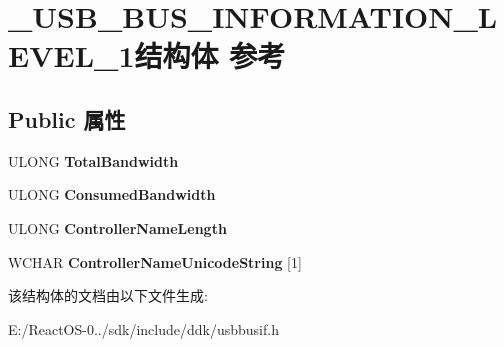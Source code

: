 \hypertarget{struct___u_s_b___b_u_s___i_n_f_o_r_m_a_t_i_o_n___l_e_v_e_l__1}{}\section{\+\_\+\+U\+S\+B\+\_\+\+B\+U\+S\+\_\+\+I\+N\+F\+O\+R\+M\+A\+T\+I\+O\+N\+\_\+\+L\+E\+V\+E\+L\+\_\+1结构体 参考}
\label{struct___u_s_b___b_u_s___i_n_f_o_r_m_a_t_i_o_n___l_e_v_e_l__1}
\subsection*{Public 属性}
\begin{DoxyCompactItemize}
\item 
\mbox{\label{struct___u_s_b___b_u_s___i_n_f_o_r_m_a_t_i_o_n___l_e_v_e_l__1_abca0293491496fd0ff783f51dae04a30}} 
U\+L\+O\+NG {\bfseries Total\+Bandwidth}
\item 
\mbox{\label{struct___u_s_b___b_u_s___i_n_f_o_r_m_a_t_i_o_n___l_e_v_e_l__1_ac5557baab25b7586d24a7fef67649010}} 
U\+L\+O\+NG {\bfseries Consumed\+Bandwidth}
\item 
\mbox{\label{struct___u_s_b___b_u_s___i_n_f_o_r_m_a_t_i_o_n___l_e_v_e_l__1_a5340eefd6d869e8535144055292caf1d}} 
U\+L\+O\+NG {\bfseries Controller\+Name\+Length}
\item 
\mbox{\label{struct___u_s_b___b_u_s___i_n_f_o_r_m_a_t_i_o_n___l_e_v_e_l__1_a7812983932225db77107044691337ff7}} 
W\+C\+H\+AR {\bfseries Controller\+Name\+Unicode\+String} \mbox{[}1\mbox{]}
\end{DoxyCompactItemize}


该结构体的文档由以下文件生成\+:\begin{DoxyCompactItemize}
\item 
E\+:/\+React\+O\+S-\/0../sdk/include/ddk/usbbusif.\+h\end{DoxyCompactItemize}
